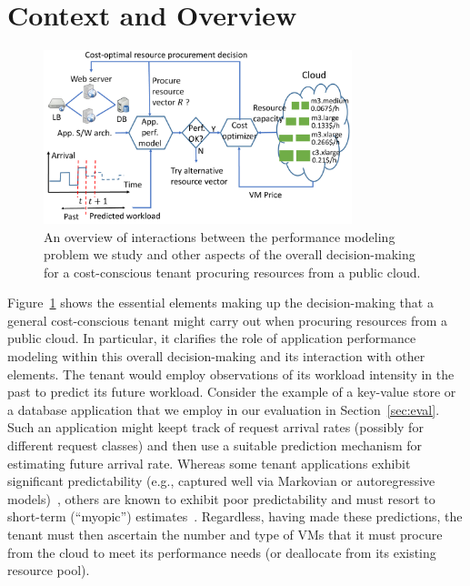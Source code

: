 \section{Context and Overview}
\label{sec:back}
\vspace{10pt}

 
\begin{figure}%
\centering
\includegraphics[width=0.8\textwidth]{system}
\caption{An overview of interactions between the performance modeling problem we study and other aspects of the overall decision-making for a cost-conscious tenant procuring resources from a public cloud. }
\label{fig:diagram}
\end{figure}

Figure~\ref{fig:diagram} shows the essential elements making up the decision-making that a general cost-conscious tenant might carry out when procuring resources from a public cloud. In particular, it clarifies the role of application performance modeling within this overall decision-making and its interaction with other elements. 
The tenant would employ observations of its workload intensity in the past to predict its future workload. Consider the example of a key-value store or a database application that we employ in our evaluation in Section~\ref{sec:eval}. Such an application might keept track of request arrival rates (possibly for different request classes) and then use a suitable prediction mechanism for estimating future arrival rate. Whereas some tenant applications exhibit significant predictability (e.g., captured well via Markovian or autoregressive models)~\cite{xxx}, others are known to exhibit poor predictability and must resort to short-term (``myopic'') estimates~\cite{xxx}. Regardless, having made these predictions, the tenant must then ascertain the number and type of VMs that it must procure from the cloud to meet its performance needs (or deallocate from its existing resource pool). 

